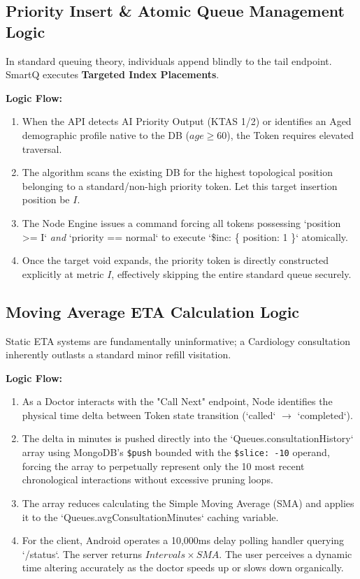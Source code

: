 \documentclass[12pt,a4paper]{article}
\begin{document}
\subsection{Priority Insert \& Atomic Queue Management Logic}

In standard queuing theory, individuals append blindly to the tail endpoint. SmartQ executes \textbf{Targeted Index Placements}.

\textbf{Logic Flow:}
\begin{enumerate}
    \item When the API detects AI Priority Output (KTAS 1/2) or identifies an Aged demographic profile native to the DB ($age \geq 60$), the Token requires elevated traversal.
    \item The algorithm scans the existing DB for the highest topological position belonging to a standard/non-high priority token. Let this target insertion position be $I$.
    \item The Node Engine issues a command forcing all tokens possessing `position >= I` \textit{and} `priority == normal` to execute `\$inc: \{ position: 1 \}` atomically.
    \item Once the target void expands, the priority token is directly constructed explicitly at metric $I$, effectively skipping the entire standard queue securely.
\end{enumerate}

\subsection{Moving Average ETA Calculation Logic}

Static ETA systems are fundamentally uninformative; a Cardiology consultation inherently outlasts a standard minor refill visitation.

\textbf{Logic Flow:}
\begin{enumerate}
    \item As a Doctor interacts with the "Call Next" endpoint, Node identifies the physical time delta between Token state transition (`called` $\rightarrow$ `completed`). 
    \item The delta in minutes is pushed directly into the `Queues.consultationHistory` array using MongoDB's \texttt{\$push} bounded with the \texttt{\$slice: -10} operand, forcing the array to perpetually represent only the 10 most recent chronological interactions without excessive pruning loops.
    \item The array reduces calculating the Simple Moving Average (SMA) and applies it to the `Queues.avgConsultationMinutes` caching variable.
    \item For the client, Android operates a 10,000ms delay polling handler querying `/status`. The server returns $Intervals \times SMA$. The user perceives a dynamic time altering accurately as the doctor speeds up or slows down organically.
\end{enumerate}
\end{document}
